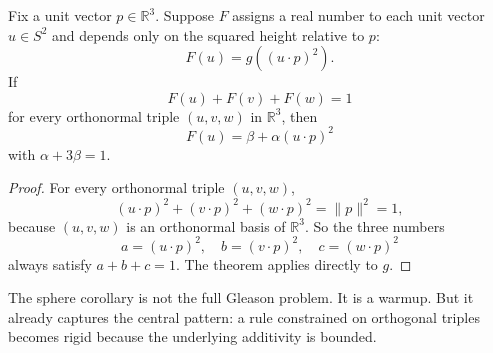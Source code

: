 \begin{corollary}
Fix a unit vector $p\in\mathbb{R}^3$. Suppose $F$ assigns a real number to each unit vector $u\in S^2$ and depends only on the squared height relative to $p$:
\[
F(u)=g((u\cdot p)^2).
\]
If
\[
F(u)+F(v)+F(w)=1
\]
for every orthonormal triple $(u,v,w)$ in $\mathbb{R}^3$, then
\[
F(u)=\beta+\alpha (u\cdot p)^2
\]
with $\alpha+3\beta=1$.
\end{corollary}

\begin{proof}
For every orthonormal triple $(u,v,w)$,
\[
(u\cdot p)^2+(v\cdot p)^2+(w\cdot p)^2=\|p\|^2=1,
\]
because $(u,v,w)$ is an orthonormal basis of $\mathbb{R}^3$. So the three numbers
\[
a=(u\cdot p)^2,\quad b=(v\cdot p)^2,\quad c=(w\cdot p)^2
\]
always satisfy $a+b+c=1$. The theorem applies directly to $g$.
\end{proof}

The sphere corollary is not the full Gleason problem. It is a warmup. But it already captures the central pattern: a rule constrained on orthogonal triples becomes rigid because the underlying additivity is bounded.
